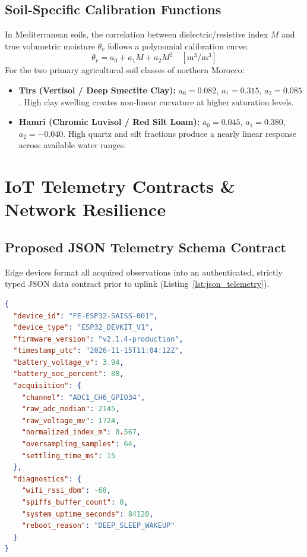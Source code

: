 \documentclass[11pt,a4paper,oneside]{report}
\begin{document}
\section{Soil-Specific Calibration Functions}
In Mediterranean soils, the correlation between dielectric/resistive index $M$ and true volumetric moisture $\theta_v$ follows a polynomial calibration curve:
\begin{equation}
\theta_v = a_0 + a_1 M + a_2 M^2 \quad [\text{m}^3/\text{m}^3]
\end{equation}
For the two primary agricultural soil classes of northern Morocco:
\begin{itemize}[leftmargin=*]
    \item \textbf{Tirs (Vertisol / Deep Smectite Clay):} $a_0 = 0.082$, $a_1 = 0.315$, $a_2 = 0.085$. High clay swelling creates non-linear curvature at higher saturation levels.
    \item \textbf{Hamri (Chromic Luvisol / Red Silt Loam):} $a_0 = 0.045$, $a_1 = 0.380$, $a_2 = -0.040$. High quartz and silt fractions produce a nearly linear response across available water ranges.
\end{itemize}

\chapter{IoT Telemetry Contracts \& Network Resilience}

\section{Proposed JSON Telemetry Schema Contract}
Edge devices format all acquired observations into an authenticated, strictly typed JSON data contract prior to uplink (Listing~\ref{lst:json_telemetry}).

\begin{lstlisting}[language=json,caption={Farmer Eye Standard JSON Telemetry Payload Contract.},label={lst:json_telemetry}]
{
  "device_id": "FE-ESP32-SAISS-001",
  "device_type": "ESP32_DEVKIT_V1",
  "firmware_version": "v2.1.4-production",
  "timestamp_utc": "2026-11-15T11:04:12Z",
  "battery_voltage_v": 3.94,
  "battery_soc_percent": 88,
  "acquisition": {
    "channel": "ADC1_CH6_GPIO34",
    "raw_adc_median": 2145,
    "raw_voltage_mv": 1724,
    "normalized_index_m": 0.567,
    "oversampling_samples": 64,
    "settling_time_ms": 15
  },
  "diagnostics": {
    "wifi_rssi_dbm": -68,
    "spiffs_buffer_count": 0,
    "system_uptime_seconds": 84120,
    "reboot_reason": "DEEP_SLEEP_WAKEUP"
  }
}
\end{lstlisting}
\end{document}
